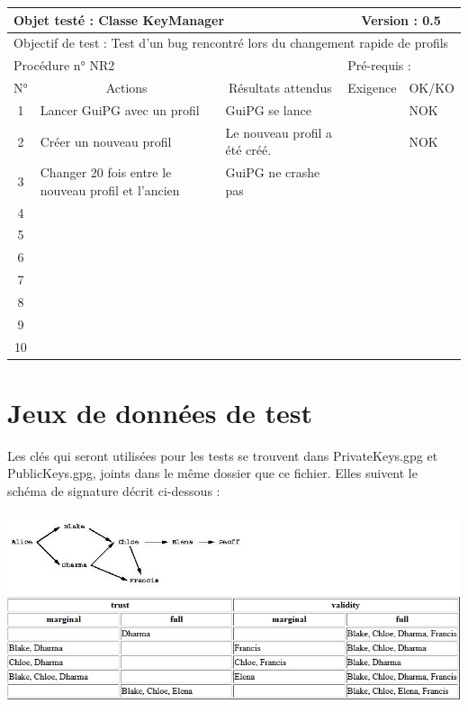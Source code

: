 \documentclass{../res/univ-projet}
\begin{document}
\begin{center}
    \begin{tabular}{|c|p{5cm}|p{5cm}|p{1.5cm}|p{1.5cm}|}
      \hline
      \multicolumn{3}{|l|}{Objet testé : Classe KeyManager} & \multicolumn{2}{c|}{Version : 0.5}\\ \hline
      \multicolumn{5}{|l|}{Objectif de test : Test d'un bug rencontré lors du changement rapide de profils}\\ \hline
      \multicolumn{3}{|l|}{Procédure n° NR2} & \multicolumn{2}{p{3cm}|}{Pré-requis : }\\ \hline
      \multicolumn{1}{|c|}{N°} & \multicolumn{1}{c|}{Actions} & \multicolumn{1}{c|}{Résultats attendus} & 
      \multicolumn{1}{c|}{Exigence} & \multicolumn{1}{c|}{OK/KO}\\ \hline
      1 & Lancer GuiPG avec un profil & GuiPG se lance &  & NOK \\
      2 & Créer un nouveau profil & Le nouveau profil a été créé. &  & NOK \\
      3 & Changer 20 fois entre le nouveau profil et l'ancien & GuiPG ne crashe pas &  & \\
      4 &  &  &  & \\
      5 &  &  &  & \\
      6 &  &  &  & \\
      7 &  &  &  & \\
      8 &  &  &  & \\
      9 &  &  &  & \\
      10 &  &  &  &\\ 
  \hline
    \end{tabular}
    \vskip 2.2cm
    
\end{center}

\section{Jeux de données de test}

Les clés qui seront utilisées pour les tests se trouvent dans PrivateKeys.gpg et PublicKeys.gpg, joints dans le même dossier que ce fichier.
Elles suivent le schéma de signature décrit ci-dessous :

\includegraphics[scale=0.80]{graphics/trust_example.png}
\end{document}
